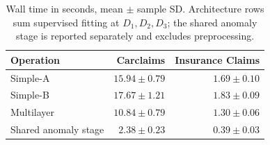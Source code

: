 \begin{table}[!htbp]\centering\footnotesize
\caption{Wall time in seconds, mean $\pm$ sample SD. Architecture rows sum supervised fitting at $D_1,D_2,D_3$; the shared anomaly stage is reported separately and excludes preprocessing.}\label{tab:runtime}
\setlength{\tabcolsep}{2pt}
\begin{tabular}{lrr}\toprule
Operation & Carclaims & Insurance Claims\\\midrule
Simple-A & $15.94 \pm 0.79$ & $1.69 \pm 0.10$\\
Simple-B & $17.67 \pm 1.21$ & $1.83 \pm 0.09$\\
Multilayer & $10.84 \pm 0.79$ & $1.30 \pm 0.06$\\
Shared anomaly stage & $2.38 \pm 0.23$ & $0.39 \pm 0.03$\\
\bottomrule\end{tabular}
\end{table}
